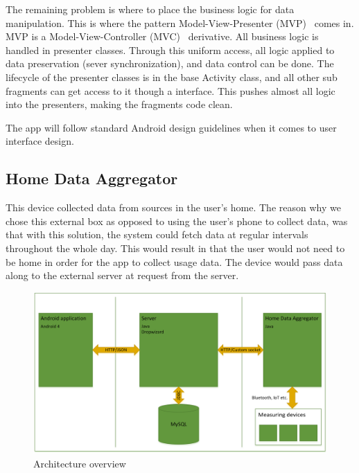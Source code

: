 The remaining problem is where to place the business logic for data manipulation. This is where the pattern Model-View-Presenter (MVP)~\cite{mvp} comes in. MVP is a Model-View-Controller (MVC)~\cite{mvc} derivative. All business logic is handled in presenter classes. Through this uniform access, all logic applied to data preservation (sever synchronization), and data control can be done. The lifecycle of the presenter classes is in the base Activity class, and all other sub fragments can get access to it though a interface. This pushes almost all logic into the presenters, making the fragments code clean.

The app will follow standard Android design guidelines when it comes to user interface design.

\subsection{Home Data Aggregator}
This device collected data from sources in the user's home. The reason why we chose this external box as opposed to using the user's phone to collect data, was that with this solution, the system could fetch data at regular intervals throughout the whole day. This would result in that the user would not need to be home in order for the app to collect 
usage data. The device would pass data along to the external server at request from the server.

\begin{figure}[H]
\includegraphics[width=\textwidth]{ch/architecture/fig/architecture.png}
\caption{Architecture overview}
\end{figure}
